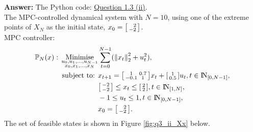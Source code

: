 \documentclass[a4paper,11pt,reqno]{amsart}
\newcommand{\N}{{\rm I\!N}}
\begin{document}
\textbf{Answer:} 
The Python code: \href{https://github.com/Gczmy/ELE8088/blob/main/Coursework1/Python_code/3_ii.py}{Question 1.3 (ii)}.
\\
The MPC-controlled dynamical system with $N=10$, using one of the extreme points of $X_N$ as the initial state, $x_0=\begin{bsmallmatrix}\ \ 2\\-2\end{bsmallmatrix}$.
\\
MPC controller:
\begin{subequations}
    \begin{align}
        \mathbb{P}_N(x){}:{}
        \operatorname*{Minimise}_{\substack{u_0,u_1,\ldots,u_{N-1}\\ x_0,x_1,\ldots,x_N}}&\sum_{t=0}^{N-1} (\left\lVert x_t\right\rVert ^2_2+u_t^2),
        \\
        \text{subject to: }& x_{t+1} = 
        \begin{bsmallmatrix}
            1&0.7\\
            -0.1&1
        \end{bsmallmatrix}x_t + 
        \begin{bsmallmatrix}
            1\\
            0.5
        \end{bsmallmatrix}u_t, t\in\N_{[0,N-1]},
        \\
        &\begin{bsmallmatrix}
            -2\\
            -2
        \end{bsmallmatrix} 
        \leq x_t \leq 
        \begin{bsmallmatrix}
            2\\
            2
        \end{bsmallmatrix}, t\in\N_{[1,N]},
        \\
        &-1 \leq u_t \leq 1, t\in\N_{[0,N-1]},
        \\
        & x_0 = \begin{bsmallmatrix}\ \ 2\\-2\end{bsmallmatrix}.
    \end{align}
\end{subequations}
The set of feasible states is shown in Figure \ref{fig:q3_ii_Xx} below.
\end{document}
